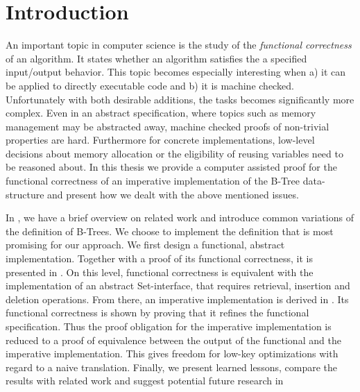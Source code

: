 

\chapter{Introduction}\label{chapter:introduction}

An important topic in computer science is the study of the
\textit{functional correctness} of an algorithm.
It states whether an algorithm satisfies the a specified
input/output behavior.
This topic becomes especially interesting when a) it can be applied
to directly executable code and b) it is machine checked.
Unfortunately with both desirable additions, the tasks becomes
significantly more complex.
Even in an abstract specification, where topics such as
memory management may be abstracted away,
machine checked proofs of non-trivial properties
are hard.
Furthermore for concrete implementations,
low-level decisions about memory allocation or
the eligibility of reusing variables need to be
reasoned about.
In this thesis we provide a computer assisted proof for the functional
correctness of an imperative implementation of the B-Tree data-structure
and present how we dealt with the above mentioned issues.

In , we have a brief overview on related
work and introduce common variations of the definition of B-Trees.
We choose to implement the definition that is most promising for our approach.
We first design a functional, abstract implementation.
Together with a proof of its functional correctness,
it is presented in .
On this level, functional correctness is equivalent with the
implementation of an abstract Set-interface,
that requires retrieval, insertion and deletion operations.
From there, an imperative implementation is derived in .
Its functional correctness is shown by proving that it refines the functional specification.
Thus the proof obligation for the imperative implementation
is reduced to a proof of equivalence between the output of the
functional and the imperative implementation.
This gives freedom for low-key optimizations with regard to a naive translation.
Finally, we present learned lessons, compare the results with related work and suggest potential future
research in 



